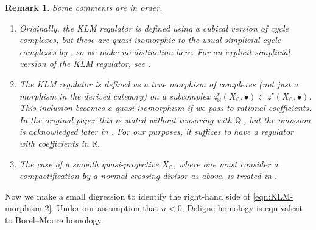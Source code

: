 \documentclass[10pt,a4paper,oneside]{article}
\newcommand{\CC}{\mathbb{C}}
\newcommand{\QQ}{\mathbb{Q}}
\newcommand{\RR}{\mathbb{R}}
\theoremstyle{myplain}
\theoremstyle{mydefinition}
\newtheorem{remark}[theorem]{Remark}
\numberwithin{equation}{section}
\begin{document}
\begin{remark}
  Some comments are in order.

  \begin{enumerate}
  \item Originally, the KLM regulator is defined using a cubical version of
    cycle complexes, but these are quasi-isomorphic to the usual simplicial
    cycle complexes by \cite{Levine-1994}, so we make no distinction here.
    For an explicit simplicial version of the KLM regulator, see
    \cite{Kerr-Lewis-Lopatto-2018}.

  \item The KLM regulator is defined as a true morphism of complexes (not just a
    morphism in the derived category) on a subcomplex
    $z^r_\RR (X_\CC, \bullet) \subset z^r (X_\CC, \bullet)$. This inclusion
    becomes a quasi-isomorphism if we pass to rational coefficients. In the
    original paper \cite{Kerr-Lewis-Muller-Stach-2006} this is stated without
    tensoring with $\QQ$ , but the omission is acknowledged later in
    \cite{Kerr-Lewis-2007}. For our purposes, it suffices to have a regulator
    with coefficients in $\RR$.

  \item The case of a smooth quasi-projective $X_\CC$, where one must consider a
    compactification by a normal crossing divisor as above, is treated in
    \cite[\S 5.9]{Kerr-Lewis-Muller-Stach-2006}.
  \end{enumerate}
\end{remark}

Now we make a small digression to identify the right-hand side of
\eqref{eqn:KLM-morphism-2}. Under our assumption that $n < 0$, Deligne
homology is equivalent to Borel--Moore homology.
\end{document}

